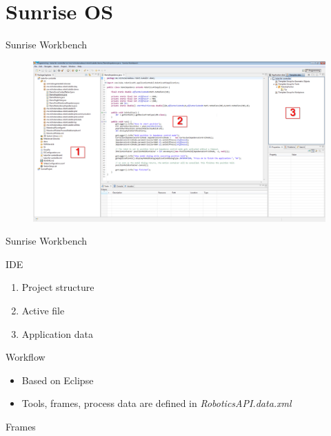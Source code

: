 \documentclass{beamer}
\begin{document}
\section{Sunrise OS}

\begin{frame}{Sunrise Workbench}
  \begin{figure}
    \includegraphics[width=\textwidth]{sunrise-workbench.png}
  \end{figure}
\end{frame}

\begin{frame}{Sunrise Workbench}
  \begin{block}{IDE}
    \begin{enumerate}
      \item Project structure
      \item Active file
      \item Application data
    \end{enumerate}
  \end{block}

  \begin{block}{Workflow}
    \begin{itemize}
      \item Based on Eclipse
      \item Tools, frames, process data are defined in \textit{RoboticsAPI.data.xml}
    \end{itemize}
  \end{block}
\end{frame}

\begin{frame}[fragile]{Frames}
\end{frame}
\end{document}
